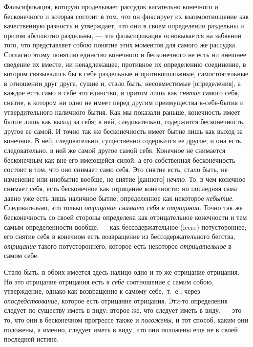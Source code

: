 Фальсификация, которую проделывает рассудок касательно конечного и
бесконечного и которая состоит в том, что он фиксирует их взаимоотношение
как качественную разность и утверждает, что они в своем определении
раздельны и притом абсолютно раздельны, — эта фальсификация основывается на
забвении того, что представляет собою понятие этих моментов для самого же
рассудка. Согласно этому понятию единство конечного и бесконечного не есть
ни внешнее сведение их вместе, ни ненадлежащее, противное их определению
соединение, в котором связывались бы в себе раздельные и противоположные,
самостоятельные в отношении друг друга, сущие и, стало быть, несовместимые
[определения], а каждое есть само в себе это единство, и притом лишь как
{\em снятие} самого себя, снятие, в котором ни одно не
имеет перед другим преимущества в-себе-бытия и утвердительного наличного
бытия. Как мы показали раньше, конечность имеет бытие лишь как выход за
себя; в ней, следовательно, содержится бесконечность, другое ее самой. И
точно так же бесконечность имеет бытие лишь как выход за конечное. В ней,
следовательно, существенно содержится ее другое, и она есть, следовательно,
в ней же самой другое самой себя. Конечное не снимается бесконечным как вне
его имеющейся силой, а его собственная бесконечность состоит в том, что оно
снимает само себя. Это снятие есть, стало быть, не изменение или инобытие
вообще, не снятие [данного] {\em нечто}. То, в чем
конечное снимает себя, есть бесконечное как отрицание конечности; но
последняя сама давно уже есть лишь наличное бытие, определенное как
некоторое {\em небытие}. Следовательно, это только
{\em отрицание снимает себя в отрицании}. Точно так же
бесконечность со своей стороны определена как отрицательное конечности и
тем самым определенности вообще, — как бессодержательное (leere)
потустороннее; его снятие себя в конечном есть возвращение из
бессодержательного бегства, {\em отрицание} такого
потустороннего, которое есть некоторое
{\em отрицательное} в самом себе.

Стало быть, в обоих имеется здесь налицо одно и то же отрицание отрицания.
Но это отрицание отрицания есть {\em в себе}
соотношение с самим собою, утверждение, однако как возвращение к самому
себе,~т.~е., через {\em опосредствование}, которое есть
отрицание отрицания. Эти-то определения следует по существу иметь в виду;
второе же, что следует иметь в виду, — это то, что они в бесконечном
прогрессе также и {\em положены}, и тот способ, каким
они положены, а именно, следует иметь в виду, что они положены еще не в
своей последней истине.

